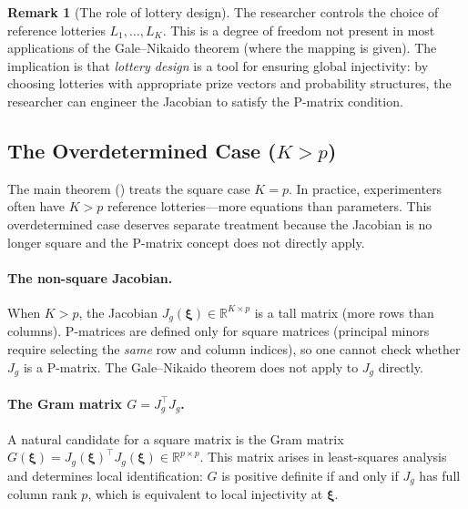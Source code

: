 \documentclass[11pt,a4paper]{article}
\theoremstyle{definition}
\newtheorem{remark}[theorem]{Remark}
\newcommand{\R}{\mathbb{R}}
\newcommand{\bxi}{\boldsymbol{\xi}}
\begin{document}
\begin{remark}[The role of lottery design]
The researcher controls the choice of reference lotteries $L_1, \ldots, L_K$.
This is a degree of freedom not present in most applications of the
Gale--Nikaido theorem (where the mapping is given). The implication is that
\emph{lottery design} is a tool for ensuring global injectivity: by choosing
lotteries with appropriate prize vectors and probability structures, the
researcher can engineer the Jacobian to satisfy the P-matrix condition.
\end{remark}

\subsection{The Overdetermined Case ($K > p$)}
\label{sec:overdetermined}

The main theorem () treats the square case $K = p$. In
practice, experimenters often have $K > p$ reference lotteries---more
equations than parameters. This overdetermined case deserves separate
treatment because the Jacobian is no longer square and the P-matrix concept
does not directly apply.

\paragraph{The non-square Jacobian.}
When $K > p$, the Jacobian $J_g(\bxi) \in \R^{K \times p}$ is a tall matrix
(more rows than columns). P-matrices are defined only for square matrices
(principal minors require selecting the \emph{same} row and column indices),
so one cannot check whether $J_g$ is a P-matrix. The Gale--Nikaido theorem
does not apply to $J_g$ directly.

\paragraph{The Gram matrix $G = J_g^\top J_g$.}
A natural candidate for a square matrix is the Gram matrix
$G(\bxi) = J_g(\bxi)^\top J_g(\bxi) \in \R^{p \times p}$. This matrix
arises in least-squares analysis and determines local identification: $G$
is positive definite if and only if $J_g$ has full column rank $p$, which
is equivalent to local injectivity at $\bxi$.
\end{document}

